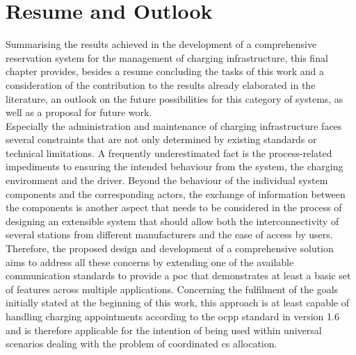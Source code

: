 

\chapter{Resume and Outlook}
\label{ch:Resume and Outlook}

Summarising the results achieved in the development of a comprehensive reservation system for the management of charging infrastructure, this final chapter provides, besides a resume concluding the tasks of this work and a consideration of the contribution to the results already elaborated in the literature, an outlook on the future possibilities for this category of systems, as well as a proposal for future work. \\
\noindent Especially the administration and maintenance of charging infrastructure faces several constraints that are not only determined by existing standards or technical limitations. A frequently underestimated fact is the process-related impediments to ensuring the intended behaviour from the system, the charging environment and the driver.
Beyond the behaviour of the individual system components and the corresponding actors, the exchange of information between the components is another aspect that needs to be considered in the process of designing an extensible system that should allow both the interconnectivity of several stations from different manufacturers and the ease of access by users.
Therefore, the proposed design and development of a comprehensive solution aims to address all these concerns by extending one of the available communication standards to provide a \acrshort{poc} that demonstrates at least a basic set of features across multiple applications.
Concerning the fulfilment of the goals initially stated at the beginning of this work, this approach is at least capable of handling charging appointments according to the \acrshort{ocpp} standard in version 1.6 and is therefore applicable for the intention of being used within universal scenarios dealing with the problem of coordinated \acrshort{cs} allocation. 
